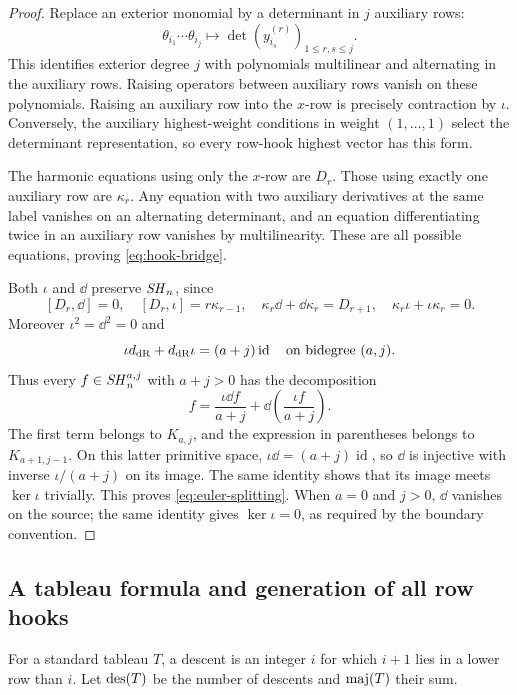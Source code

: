 \begin{proof}
Replace an exterior monomial by a determinant in $j$ auxiliary
rows:
\begin{equation}\label{eq:determinant-replacement}
 \theta_{i_1}\cdots\theta_{i_j}
 \longmapsto
 \det(y_{i_s}^{(r)})_{1\leq r,s\leq j}.
\end{equation}
This identifies exterior degree $j$ with polynomials
multilinear and alternating in the auxiliary rows.
Raising operators between auxiliary rows vanish on these
polynomials.  Raising an auxiliary row into the $x$-row
is precisely contraction by $\iota$.
Conversely, the auxiliary highest-weight conditions in
weight $(1,\ldots,1)$ select the determinant representation,
so every row-hook highest vector has this form.

The harmonic equations using only the $x$-row are $D_r$.
Those using exactly one auxiliary row are $\kappa_r$.
Any equation with two auxiliary derivatives at the same
label vanishes on an alternating determinant, and an equation
differentiating twice in an auxiliary row vanishes by
multilinearity.  These are all possible equations, proving
\eqref{eq:hook-bridge}.

Both $\iota$ and $\dd$ preserve $\mathit{SH}_n$, since
\[
 [D_r,\dd]=0,\quad [D_r,\iota]=r\kappa_{r-1},\quad
 \kappa_r\dd+\dd\kappa_r=D_{r+1},\quad
 \kappa_r\iota+\iota\kappa_r=0.
\]
Moreover $\iota^2=\dd^2=0$ and
\[
 \iota d_{\mathrm{dR}}+d_{\mathrm{dR}}\iota=(a+j)\operatorname{id}
       \quad\hbox{on bidegree }(a,j).
\]
Thus every $f\in\mathit{SH}_n^{a,j}$ with $a+j>0$ has the decomposition
\[
 f=\frac{\iota\dd f}{a+j}
       +\dd\left(\frac{\iota f}{a+j}\right).
\]
The first term belongs to $K_{a,j}$, and the expression in
parentheses belongs to $K_{a+1,j-1}$.  On this latter primitive
space, $\iota\dd=(a+j)\operatorname{id}$, so $\dd$ is injective
with inverse $\iota/(a+j)$ on its image.  The same identity shows
that its image meets $\ker\iota$ trivially.  This proves
\eqref{eq:euler-splitting}.
When $a=0$ and $j>0$, $\dd$ vanishes on the source;
the same identity gives $\ker\iota=0$, as required by
the boundary convention.
\end{proof}

\subsection{A tableau formula and generation of all row hooks}

For a standard tableau $T$, a descent is an integer $i$ for
which $i+1$ lies in a lower row than $i$.
Let $\operatorname{des}(T)$ be the number of descents and $\operatorname{maj}(T)$ their sum.

